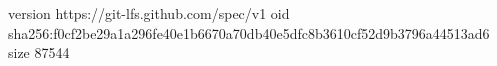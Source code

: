 version https://git-lfs.github.com/spec/v1
oid sha256:f0cf2be29a1a296fe40e1b6670a70db40e5dfc8b3610cf52d9b3796a44513ad6
size 87544

